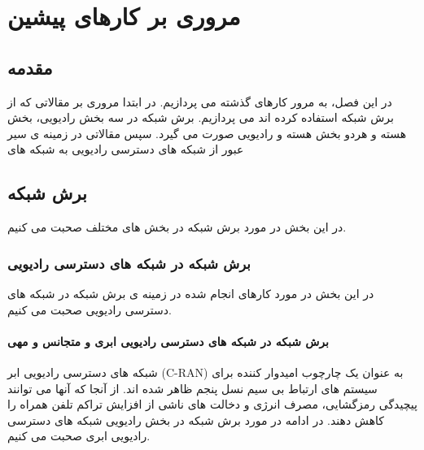 \chapter{مروری بر کارهای پیشین}

\section{مقدمه}
در این فصل، به مرور کارهای گذشته می پردازیم.
در ابتدا مروری بر مقالاتی که از برش شبکه استفاده کرده اند می پردازیم.
برش شبکه در سه بخش رادیویی، بخش هسته و هردو بخش هسته و رادیویی صورت می گیرد.
سپس مقالاتی در زمینه ی سیر عبور از شبکه های دسترسی رادیویی به شبکه های
\section{برش شبکه}
در این بخش در مورد برش شبکه در بخش های مختلف صحبت می  کنیم.
\subsection{برش شبکه در شبکه های دسترسی رادیویی }
در این بخش در مورد کارهای انجام شده در زمینه ی برش شبکه در شبکه های دسترسی رادیویی صحبت می کنیم.

\subsubsection{  برش شبکه در شبکه های دسترسی رادیویی ابری و متجانس و مهی}
شبکه های دسترسی رادیویی ابر (C-RAN) به عنوان یک چارچوب امیدوار کننده برای سیستم های ارتباط بی سیم نسل پنجم ظاهر شده اند.
از آنجا که آنها می توانند پیچیدگی رمزگشایی، مصرف انرژی و دخالت های ناشی از افزایش تراکم تلفن همراه را کاهش دهند\cite{cranInt}.
در ادامه در مورد برش شبکه در بخش رادیویی شبکه های دسترسی رادیویی ابری صحبت می کنیم.


